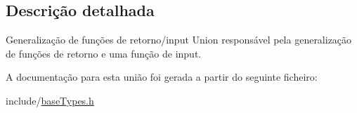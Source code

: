 \subsection{Descrição detalhada}
Generalização de funções de retorno/input Union responsável pela generalização de funções de retorno e uma função de input. 

A documentação para esta união foi gerada a partir do seguinte ficheiro\+:\begin{DoxyCompactItemize}
\item 
include/\hyperlink{baseTypes_8h}{base\+Types.\+h}\end{DoxyCompactItemize}
